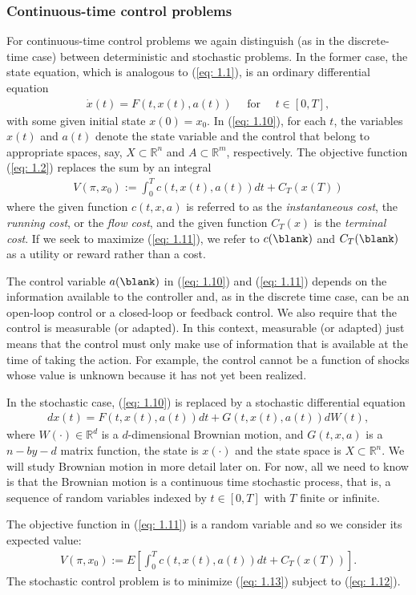\documentclass[\topdir/lecture\_notes.tex]{subfiles}
\begin{document}
\subsubsection*{Continuous-time control problems}\label{rmk: 1.6} 
For continuous-time control problems we again distinguish (as in the discrete-time case) between deterministic and stochastic problems. In the former case, the state equation, which is analogous to (\ref{eq: 1.1}), is an ordinary differential equation
\begin{align}
\dot{x}(t)=F(t, x(t), a(t)) \quad \text { for } \quad t \in[0, T], \label{eq: 1.10}
\end{align}
with some given initial state $x(0)=x_{0}$. In (\ref{eq: 1.10}), for each $t$, the variables $x(t)$ and $a(t)$ denote the state variable and the control that belong to appropriate spaces, say, $X \subset \mathbb{R}^{n}$ and $A \subset \mathbb{R}^{m}$, respectively. The objective function (\ref{eq: 1.2}) replaces the sum by an integral
\begin{align}
V(\pi, x_{0}):=\int_{0}^{T} c(t, x(t), a(t)) d t+C_{T}(x(T)) \label{eq: 1.11}
\end{align}
where the given function $c(t, x, a)$ is referred to as the \emph{instantaneous cost}, the \emph{running cost}, or the \emph{flow cost}, and the given function $C_{T}(x)$ is the \emph{terminal cost}. If we seek to maximize (\ref{eq: 1.11}), we refer to $c(\blank)$ and $C_{T}(\blank)$ as a utility or reward rather than a cost.

The control variable $a(\blank)$ in (\ref{eq: 1.10}) and (\ref{eq: 1.11}) depends on the information available to the controller and, as in the discrete time case, can be an open-loop control or a closed-loop or feedback control. We also require that the control is measurable (or adapted). In this context, measurable (or adapted) just means that the control must only make use of information that is available at the time of taking the action. For example, the control cannot be a function of shocks whose value is unknown because it has not yet been realized.

In the stochastic case, (\ref{eq: 1.10}) is replaced by a stochastic differential equation
\begin{align}
d x(t)=F(t, x(t), a(t)) d t+G(t, x(t), a(t)) d W(t), \label{eq: 1.12}
\end{align}
where  $W(\cdot) \in \mathbb{R}^{d}$ is a $d$-dimensional Brownian motion, and $G(t, x, a)$ is a $n-by-d$ matrix function, the state is $x(\cdot)$ and the state space is $X \subset \mathbb{R}^{n}$. We will study Brownian motion in more detail later on. For now, all we need to know is that the Brownian motion is a continuous time stochastic process, that is, a sequence of random variables indexed by $t \in [0,T]$ with $T$ finite or infinite.

The objective function in (\ref{eq: 1.11}) is a random variable and so we consider its expected value:
\begin{align}
V(\pi, x_{0}):=E\left[\int_{0}^{T} c(t, x(t), a(t)) d t+C_{T}(x(T))\right] . \label{eq: 1.13}
\end{align}
The stochastic control problem is to minimize (\ref{eq: 1.13}) subject to (\ref{eq: 1.12}).
\end{document}
